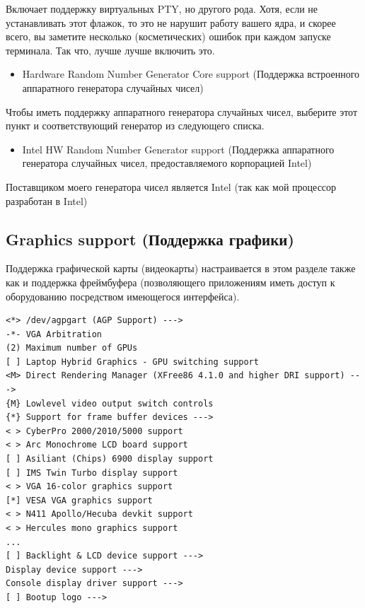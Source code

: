 \documentclass[10pt]{book}
\begin{document}
Включает поддержку виртуальных PTY, но другого рода. Хотя, если не устанавливать этот флажок, то это не нарушит работу вашего ядра, и скорее всего, вы заметите несколько (косметических) ошибок при каждом запуске терминала. Так что, лучше лучше включить это.

\begin{itemize}
\item Hardware Random Number Generator Core support (Поддержка встроенного аппаратного генератора случайных чисел) 
\end{itemize}

Чтобы иметь поддержку аппаратного генератора случайных чисел, выберите этот пункт и соответствующий генератор из следующего списка.

\begin{itemize}
\item Intel HW Random Number Generator support (Поддержка аппаратного генератора случайных чисел, предоставляемого корпорацией Intel) 
\end{itemize}

Поставщиком моего генератора чисел является Intel (так как мой процессор разработан в Intel)

\subsection{Graphics support (Поддержка графики)}

Поддержка графической карты (видеокарты) настраивается в этом разделе также как и поддержка фреймбуфера (позволяющего приложениям иметь доступ к оборудованию посредством имеющегося интерфейса).

\vspace{3mm}
\begin{tcolorbox}[colback=gray!14!white, colframe=blue!75!blue]
\begin{lstlisting}
<*> /dev/agpgart (AGP Support) --->
-*- VGA Arbitration
(2) Maximum number of GPUs
[ ] Laptop Hybrid Graphics - GPU switching support
<M> Direct Rendering Manager (XFree86 4.1.0 and higher DRI support) --->
{M} Lowlevel video output switch controls
{*} Support for frame buffer devices --->
< > CyberPro 2000/2010/5000 support
< > Arc Monochrome LCD board support
[ ] Asiliant (Chips) 6900 display support
[ ] IMS Twin Turbo display support
< > VGA 16-color graphics support
[*] VESA VGA graphics support
< > N411 Apollo/Hecuba devkit support
< > Hercules mono graphics support
...
[ ] Backlight & LCD device support --->
Display device support --->
Console display driver support --->
[ ] Bootup logo --->
\end{lstlisting}
\end{tcolorbox}
\end{document}
